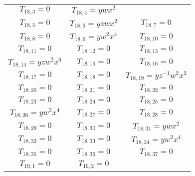 \documentclass[12pt]{memoireuqam1.3}
\begin{document}
\begin{longtable}{|c|c|c|}
$T_{18,3}= 0$&

$T_{18,4}= ywx^2$\\

$T_{18,5}= 0$&

$T_{18,6}= yzwx^2$&

$T_{18,7}= 0$\\

$T_{18,8}= 0$&

$T_{18,9}= yw^2x^4$&

$T_{18,10}= 0$\\

$T_{18,11}= 0$&

$T_{18,12}= 0$&

$T_{18,13}= 0$\\

$T_{18,14}= yzw^2x^6$&

$T_{18,15}= 0$&

$T_{18,16}= 0$\\

$T_{18,17}= 0$&

$T_{18,18}= 0$&

$T_{18,19}= yz^{-1}w^2x^2$\\

$T_{18,20}= 0$&

$T_{18,21}= 0$&

$T_{18,22}= 0$\\

$T_{18,23}= 0$&

$T_{18,24}= 0$&

$T_{18,25}= 0$\\

$T_{18,26}= yw^3x^4$&

$T_{18,27}= 0$&

$T_{18,28}= 0$\\

$T_{18,29}= 0$&

$T_{18,30}= 0$&

$T_{18,31}= ywx^2$\\

$T_{18,32}= 0$&

$T_{18,33}= 0$&

$T_{18,34}= yw^2x^4$\\

$T_{18,35}= 0$&

$T_{18,36}= 0$&

$T_{18,37}= 0$\\

$T_{19,1}= 0$&

$T_{19,2}= 0$&


\end{longtable}
\end{document}
